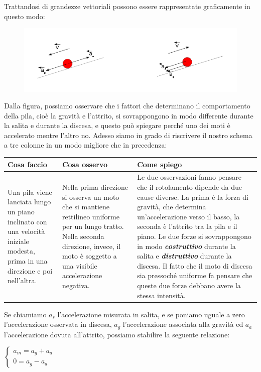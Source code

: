 Trattandosi di grandezze vettoriali possono essere rappresentate graficamente in questo modo:

\begin{figure}[H]
 \centering
 \includegraphics[width=.7\textwidth]{../immagini/leCauseDelMotoDellaPila.png}
 \label{fig:causeDelMotoDellaPila}
\end{figure}

Dalla figura, possiamo osservare che i fattori che determinano il comportamento della pila, cioè la gravità e l'attrito, si sovrappongono in modo differente durante la salita e durante la discesa, e questo può spiegare perché uno dei moti è accelerato mentre l'altro no. Adesso siamo in grado di riscrivere il nostro schema a tre colonne in un modo migliore che in precedenza:

\begin{center}
\begin{tabular}{||*{3}{p{5cm}|}|}
\hline
Cosa faccio & Cosa osservo & Come spiego \\
\hline

Una pila viene lanciata lungo un piano inclinato con una velocità iniziale modesta, prima in una direzione e poi nell'altra. &
Nella prima direzione si osserva un moto che si mantiene rettilineo uniforme per un lungo tratto.\newline
Nella seconda direzione, invece, il moto è soggetto a una visibile accelerazione negativa. &
Le due osservazioni fanno pensare che il rotolamento dipende da due cause diverse. La prima è la forza di gravità, che determina un'accelerazione verso il basso, la seconda è l'attrito tra la pila e il piano. Le due forze si sovrappongono in modo {\slshape \bf costruttivo} durante la salita e {\slshape \bf distruttivo} durante la discesa. Il fatto che il moto di discesa sia pressoché uniforme fa pensare che queste due forze debbano avere la stessa intensità. \\
\hline
\end{tabular}
\end{center}

Se chiamiamo $a_s$ l'accelerazione misurata in salita, e se poniamo uguale a zero l'accelerazione osservata in discesa, $a_g$ l'accelerazione associata alla gravità ed $a_a$ l'accelerazione dovuta all'attrito, possiamo stabilire la seguente relazione:

\begin{center}
\begin{math}
\left\{
\begin{array}{r}
a_m = a_g + a_a \\
0 = a_g - a_a
\end{array}
\right.
\end{math}
\end{center}

